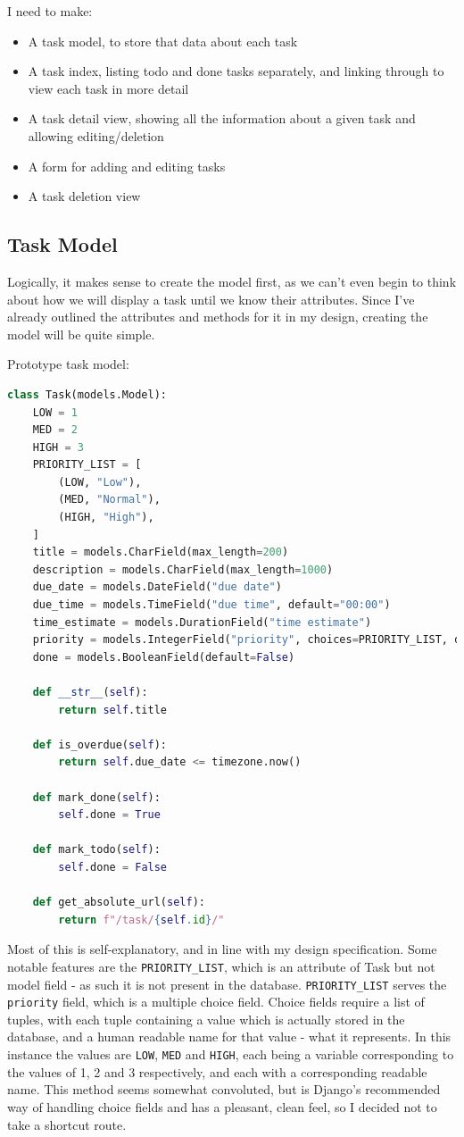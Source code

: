 \documentclass{article}
\begin{document}
I need to make:
\begin{itemize}
	\item A task model,
	      to store that data about each task
	\item A task index,
	      listing todo and done tasks separately,
	      and linking through to view each task in more detail
	\item A task detail view,
	      showing all the information about a given task and allowing editing/deletion
	\item A form for adding and editing tasks
	\item A task deletion view
\end{itemize}

\subsection{Task Model}
Logically, it makes sense to create the model first,
as we can't even begin to think about how we will display a task until we know their attributes.
Since I've already outlined the attributes and methods for it in my design,
creating the model will be quite simple.

Prototype task model:
\begin{lstlisting}[language=Python]
class Task(models.Model):
    LOW = 1
    MED = 2
    HIGH = 3
    PRIORITY_LIST = [
        (LOW, "Low"),
        (MED, "Normal"),
        (HIGH, "High"),
    ]
    title = models.CharField(max_length=200)
    description = models.CharField(max_length=1000)
    due_date = models.DateField("due date")
    due_time = models.TimeField("due time", default="00:00")
    time_estimate = models.DurationField("time estimate")
    priority = models.IntegerField("priority", choices=PRIORITY_LIST, default=2)
    done = models.BooleanField(default=False)

    def __str__(self):
        return self.title

    def is_overdue(self):
        return self.due_date <= timezone.now()

    def mark_done(self):
        self.done = True

    def mark_todo(self):
        self.done = False

    def get_absolute_url(self):
        return f"/task/{self.id}/"
\end{lstlisting}

Most of this is self-explanatory, and in line with my design specification.
Some notable features are the \texttt{PRIORITY\_LIST},
which is an attribute of Task but not model field -
as such it is not present in the database.
\texttt{PRIORITY\_LIST} serves the \texttt{priority} field,
which is a multiple choice field.
Choice fields require a list of tuples,
with each tuple containing a value which is actually stored in the database,
and a human readable name for that value - what it represents.
In this instance the values are \texttt{LOW}, \texttt{MED} and \texttt{HIGH},
each being a variable corresponding to the values of 1, 2 and 3 respectively,
and each with a corresponding readable name.
This method seems somewhat convoluted,
but is Django's recommended way of handling choice fields and has a pleasant, clean feel,
so I decided not to take a shortcut route.
\end{document}
